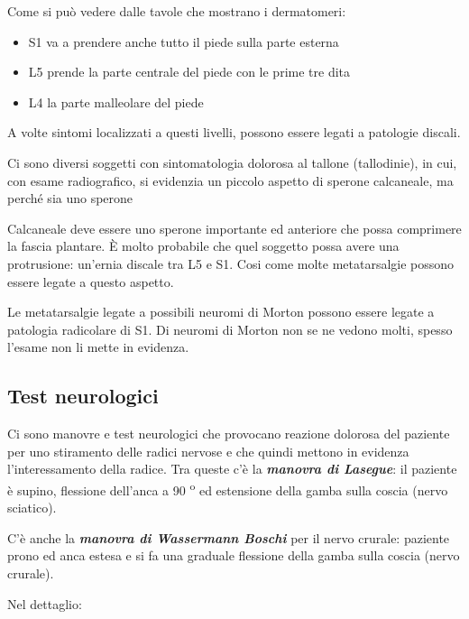 Come si può vedere dalle tavole che mostrano i dermatomeri:

\begin{itemize}
\item
  S1 va a prendere anche tutto il piede sulla parte esterna
\item
  L5 prende la parte centrale del piede con le prime tre dita
\item
  L4 la parte malleolare del piede
\end{itemize}

A volte sintomi localizzati a questi livelli, possono essere legati a
patologie discali.

Ci sono diversi soggetti con sintomatologia dolorosa al tallone
(tallodinie), in cui, con esame radiografico, si evidenzia un piccolo
aspetto di sperone calcaneale, ma perché sia uno sperone

 
Calcaneale deve essere uno sperone importante ed anteriore che possa
comprimere la fascia plantare. È molto probabile che quel soggetto possa
avere una protrusione: un'ernia discale tra L5 e S1. Cosi come molte
metatarsalgie possono essere legate a questo aspetto.
 

Le metatarsalgie legate a possibili neuromi di Morton possono essere
legate a patologia radicolare di S1. Di neuromi di Morton non se ne
vedono molti, spesso l'esame non li mette in evidenza.

\subsection{Test neurologici}


Ci sono manovre e test neurologici che provocano reazione dolorosa del
paziente per uno stiramento delle radici nervose e che quindi mettono in
evidenza l'interessamento della radice. Tra queste c'è la
\textbf{\emph{manovra di Lasegue}}: il paziente è supino, flessione
dell'anca a 90 \textsuperscript{o} ed estensione della gamba sulla coscia (nervo sciatico).

C'è anche la \textbf{\emph{manovra di Wassermann Boschi}} per il nervo
crurale: paziente prono ed anca estesa e si fa una graduale flessione
della gamba sulla coscia (nervo crurale).

Nel dettaglio:

